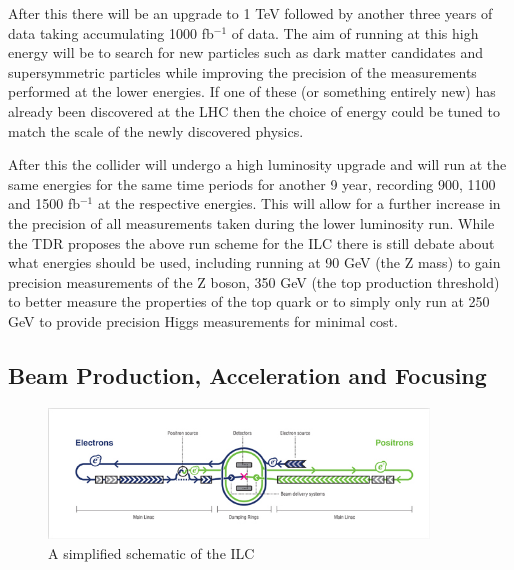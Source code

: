 After this there will be an upgrade to 1 TeV followed by another three years of data taking accumulating 1000 fb${^{-1}}$ of data. The aim of running at this high energy will be to search for new particles such as dark matter candidates and supersymmetric particles while improving the precision of the measurements performed at the lower energies. If one of these (or something entirely new) has already been discovered at the \ac{LHC} then the choice of energy could be tuned to match the scale of the newly discovered physics.

After this the collider will undergo a high luminosity upgrade and will run at the same energies for the same time periods for another 9 year, recording 900, 1100 and 1500 fb${^{-1}}$ at the respective energies. This will allow for a further increase in the precision of all measurements taken during the lower luminosity run.
While the \ac{TDR} proposes the above run scheme for the \ac{ILC} there is still debate about what energies should be used, including running at 90 GeV (the Z mass) to gain precision measurements of the Z boson, 350 GeV (the top production threshold) to better measure the properties of the top quark or to simply only run at 250 GeV to provide precision Higgs measurements for minimal cost.

\subsection{Beam Production, Acceleration and Focusing}
\label{ILC:BEAM}

\begin{figure}
  \centering
  \includegraphics[width=0.9\textwidth,keepaspectratio]{Experiments/fig/ILC_Simplified}
  \caption[Schematic of the ILC accelerator layout]{A simplified schematic of the ILC\cite{ILCTDR}}
  \label{Fig:ILCsimple}
\end{figure}

